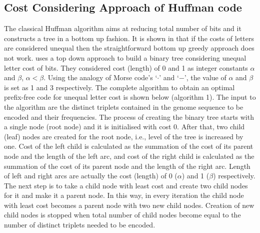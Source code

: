 \documentclass{singlecol-new}
\theoremstyle{TH}{
\newtheorem{lemma}{Lemma}
\newtheorem{theorem}[lemma]{Theorem}
\newtheorem{corrolary}[lemma]{Corrolary}
\newtheorem{conjecture}[lemma]{Conjecture}
\newtheorem{proposition}[lemma]{Proposition}
\newtheorem{claim}[lemma]{Claim}
\newtheorem{stheorem}[lemma]{Wrong Theorem}
}
\theoremstyle{THrm}{
\newtheorem{definition}{Definition}
\newtheorem{question}{Question}
\newtheorem{remark}{Remark}
\newtheorem{scheme}{Scheme}
}
\theoremstyle{THhit}{
\newtheorem{case}{Case}[section]
}
\begin{document}
\subsection{Cost Considering Approach of Huffman code}
The classical Huffman algorithm aims at reducing total number of bits and it constructs a tree in a bottom up fashion. It is shown in \citep{golin98} that if the costs of letters are considered unequal then the straightforward bottom up greedy approach does not work. \citet{Kab14} uses a top down approach to build a binary tree considering unequal letter cost of bits. They considered cost (length) of 0 and 1 as integer constants $\alpha$ and $\beta$,   $\alpha < \beta$. Using the analogy of Morse code's `$\cdot$' and `$-$', the value of $\alpha$ and $\beta$ is set as 1 and 3 respectively. The complete algorithm to obtain an optimal prefix-free code for unequal letter cost is shown below (algorithm 1). The input to the algorithm are the distinct triplets contained in the genome sequence to be encoded and their frequencies. The process of creating the binary tree starts with a single node (root node) and it is initialised with cost 0.  After that, two child (leaf) nodes are created for the root node, i.e., level of the tree is increased by one. Cost of the left child is calculated as the summation of the cost of its parent node and the length of the left arc, and cost of the right child is calculated as the summation of the cost of its parent node and the length of the right arc. Length of left and right arcs are actually the cost (length) of 0 ($\alpha$) and 1 ($\beta$) respectively. The next step is to take a child node with least cost and create two child nodes for it and make it a parent node. In this way, in every iteration the child node with least cost becomes a parent node with two new child nodes. Creation of new child nodes is stopped when total number of child nodes become equal to the number of distinct triplets needed to be encoded. 
\end{document}
